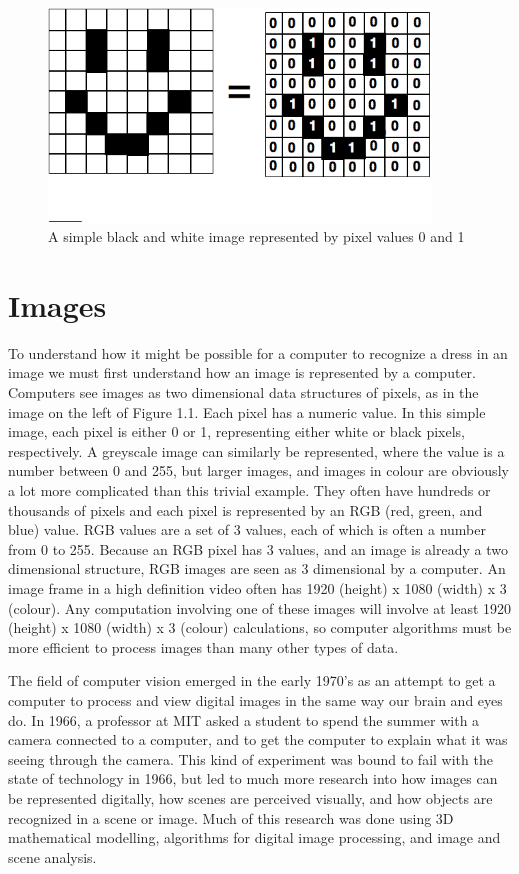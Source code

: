 \documentclass[12pt]{report} %
\begin{document}
\begin{figure}
\centering
\includegraphics[width=4in]{pixels} 
\caption[Binary Image]
	{A simple black and white image represented by pixel values 0 and 1}
\end{figure}
	
\section{Images}
	To understand how it might be possible for a computer to recognize a dress in an image we must first understand how an image is represented by a computer. Computers see images as two dimensional data structures of pixels, as in the image on the left of Figure 1.1. Each pixel has a numeric value. In this simple image, each pixel is either 0 or 1, representing either white or black pixels, respectively. A greyscale image can similarly be represented, where the value is a number between 0 and 255, but larger images, and images in colour are obviously a lot more complicated than this trivial example. They often have hundreds or thousands of pixels and each pixel is represented by an RGB (red, green, and blue) value. RGB values are a set of 3 values, each of which is often a number from 0 to 255. Because an RGB pixel has 3 values, and an image is already a two dimensional structure, RGB images are seen as 3 dimensional by a computer. An image frame in a high definition video often has 1920 (height) x 1080 (width) x 3 (colour). Any computation involving one of these images will involve at least 1920 (height) x 1080 (width) x 3 (colour) calculations, so computer algorithms must be more efficient to process images than many other types of data\cite{szeliski2010computer}. 

	The field of computer vision emerged in the early 1970's as an attempt to get a computer to process and view digital images in the same way our brain and eyes do. In 1966, a professor at MIT asked a student to spend the summer with a camera connected to a computer, and to get the computer to explain what it was seeing through the camera. This kind of experiment was bound to fail with the state of technology in 1966, but led to much more research into how images can be represented digitally, how scenes are perceived visually, and how objects are recognized in a scene or image. Much of this research was done using 3D mathematical modelling, algorithms for digital image processing, and image and scene analysis\cite{szeliski2010computer}. 
\end{document}
